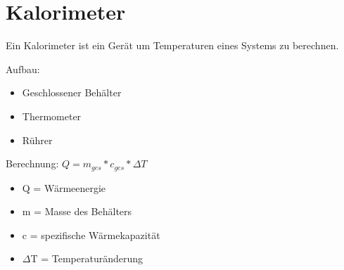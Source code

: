 \section{Kalorimeter} \label{sec:kalorimeter}
Ein Kalorimeter ist ein Gerät um Temperaturen eines Systems zu berechnen. 

Aufbau: 
\begin{itemize}
    \item Geschlossener Behälter
    \item Thermometer
    \item Rührer
\end{itemize}

Berechnung: 
$Q = m_{ges} * c_{ges} * \Delta T$
\begin{itemize}
    \item Q = Wärmeenergie
    \item m = Masse des Behälters
    \item c = spezifische Wärmekapazität
    \item $\Delta$T = Temperaturänderung
\end{itemize}
